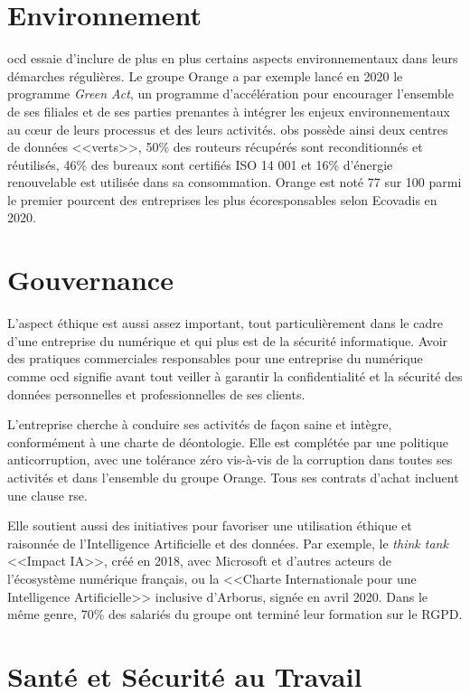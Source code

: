\documentclass[12pt, oneside, a4paper, titlepage]{report}
\begin{document}
\section{Environnement}%
\label{sec:rse::env}

\gls{ocd} essaie d'inclure de plus en plus certains aspects environnementaux
dans leurs démarches régulières. Le groupe Orange a par exemple lancé en 2020 le
programme \textit{Green Act}, un programme d'accélération pour encourager
l'ensemble de ses filiales et de ses parties prenantes à intégrer les enjeux
environnementaux au cœur de leurs processus et des leurs activités.
\acrlong{obs} possède ainsi deux centres de données <<verts>>, 50\% des routeurs
récupérés sont reconditionnés et réutilisés, 46\% des bureaux sont certifiés ISO
14 001 et 16\% d'énergie renouvelable est utilisée dans sa consommation. Orange
est noté 77 sur 100 parmi le premier pourcent des entreprises les plus
écoresponsables selon Ecovadis en 2020.

\section{Gouvernance}%
\label{sec:rse::gouv}

L'aspect éthique est aussi assez important, tout particulièrement dans le cadre
d'une entreprise du numérique et qui plus est de la sécurité informatique. Avoir
des pratiques commerciales responsables pour une entreprise du numérique comme
\acrlong{ocd} signifie avant tout veiller à garantir la confidentialité et la
sécurité des données personnelles et professionnelles de ses clients.

L'entreprise cherche à conduire ses activités de façon saine et intègre,
conformément à une charte de déontologie. Elle est complétée par une politique
anticorruption, avec une tolérance zéro vis-à-vis de la corruption dans toutes
ses activités et dans l'ensemble du groupe Orange. Tous ses contrats d'achat
incluent une clause \gls{rse}.

Elle soutient aussi des initiatives pour favoriser une utilisation éthique et
raisonnée de l'Intelligence Artificielle et des données. Par exemple, le
\textit{think tank} <<Impact IA>>, créé en 2018, avec Microsoft et d'autres
acteurs de l'écosystème numérique français, ou la <<Charte Internationale pour
une Intelligence Artificielle>> inclusive d'Arborus, signée en avril 2020. Dans
le même genre, 70\% des salariés du groupe ont terminé leur formation sur le
RGPD\@.

\section{Santé et Sécurité au Travail}%
\label{sec:rse::sst}
\end{document}

